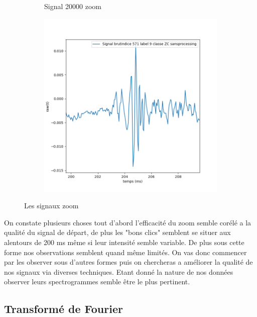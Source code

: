 \begin{figure}[!h]
\begin{subfigure}[b]{0.3\textwidth}
  \caption{Signal 20000 zoom}
  \end{subfigure}
  \begin{subfigure}[b]{0.3\textwidth}
    \includegraphics[width=\textwidth]{./images/indice571Spectro1Dlabel9classeZCsansprocessingaveczoom.png}
  \end{subfigure}
  \caption{Les signaux zoom}
\end{figure}

On constate plusieurs choses tout d'abord l'efficacité du zoom semble corélé a la qualité du signal de départ, de plus les "bons clics" semblent se situer aux alentours de 200 ms même si leur intensité semble variable. De plus sous cette forme nos observations semblent quand même limités. On vas donc commencer par les observer sous d'autres formes puis on chercheras a améliorer la qualité de nos signaux via diverses techniques. Etant donné la nature de nos données observer leurs spectrogrammes semble être le plus pertinent.

\hypertarget{Transformuxe9-de-Fourier}{%
\subsection{Transformé de Fourier}
\label{Transformuxe9-de-Fourier}}

